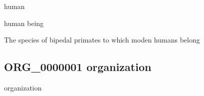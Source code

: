 \documentclass[letterpaper,10pt,english]{sphinxmanual}
\begin{document}
\begin{sphinxShadowBox}

\sphinxAtStartPar
human

\sphinxAtStartPar
human being
\end{sphinxShadowBox}

\begin{sphinxShadowBox}

\sphinxAtStartPar
{\hyperref[\detokenize{doc-BFO_0000040::doc}]{}}
\end{sphinxShadowBox}

\begin{sphinxShadowBox}

\sphinxAtStartPar
The species of bipedal primates to which moden humans belong
\end{sphinxShadowBox}

\begin{sphinxShadowBox}

\sphinxAtStartPar
{}
\end{sphinxShadowBox}
\begin{quote}

\ignorespaces \end{quote}


\subsection{ORG\_0000001 \sphinxhyphen{} organization}
\label{\detokenize{doc-ORG_0000001:org-0000001-organization}}\label{\detokenize{doc-ORG_0000001:index-0}}\label{\detokenize{doc-ORG_0000001::doc}}
\begin{sphinxShadowBox}

\sphinxAtStartPar
organization
\end{sphinxShadowBox}

\begin{sphinxShadowBox}

\sphinxAtStartPar
{\hyperref[\detokenize{doc-BFO_0000031::doc}]{}}
\end{sphinxShadowBox}
\end{document}
